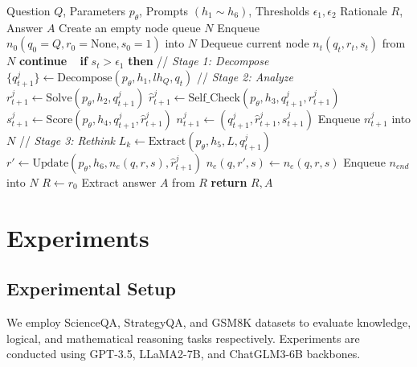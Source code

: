 \documentclass{article}
\begin{document}
\begin{algorithm}[H]
\caption{Decompose-Analyze-Rethink}
\begin{algorithmic}[1]
\Input Question $Q$, Parameters $p_\theta$, Prompts $(h_1 \sim h_6)$, Thresholds $\epsilon_1, \epsilon_2$
\Output Rationale $R$, Answer $A$
\State Create an empty node queue $N$
\State Enqueue $n_0(q_0=Q, r_0=\text{None}, s_0=1)$ into $N$
    \State Dequeue current node $n_t(q_t, r_t, s_t)$ from $N$
        \State \textbf{continue}
    \ElseAction ~ \textbf{if} $s_t > \epsilon_1$ \textbf{then}
        \State // \textit{Stage 1: Decompose}
        \State $\{q_{t+1}^j\} \leftarrow \text{Decompose}(p_\theta, h_1, lh_Q, q_t)$
        \State // \textit{Stage 2: Analyze}
        \State $r_{t+1}^j \leftarrow \text{Solve}(p_\theta, h_2, q_{t+1}^j)$
        \State $\hat{r}_{t+1}^j \leftarrow \text{Self\_Check}(p_\theta, h_3, q_{t+1}^j, r_{t+1}^j)$
        \State $s_{t+1}^j \leftarrow \text{Score}(p_\theta, h_4, q_{t+1}^j, \hat{r}_{t+1}^j)$
        \State $n_{t+1}^j \leftarrow (q_{t+1}^j, \hat{r}_{t+1}^j, s_{t+1}^j)$
        \State Enqueue $n_{t+1}^j$ into $N$
        \State // \textit{Stage 3: Rethink}
            \State $L_k \leftarrow \text{Extract}(p_\theta, h_5, L, q_{t+1}^j)$
            \State $r' \leftarrow \text{Update}(p_\theta, h_6, n_e(q,r,s), \hat{r}_{t+1}^j)$
            \State $n_e(q, r', s) \leftarrow n_e(q, r, s)$
        \Else
            \State Enqueue $n_{end}$ into $N$
        \EndIf
    \EndIf
\EndWhile
\State $R \leftarrow r_0$
\State Extract answer $A$ from $R$
\State \textbf{return} $R, A$
\end{algorithmic}
\end{algorithm}

\section{Experiments}
\subsection{Experimental Setup}
We employ ScienceQA, StrategyQA, and GSM8K datasets to evaluate knowledge, logical, and mathematical reasoning tasks respectively. Experiments are conducted using GPT-3.5, LLaMA2-7B, and ChatGLM3-6B backbones.
\end{document}
